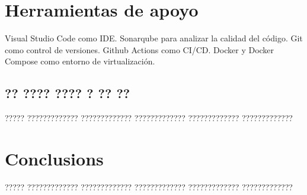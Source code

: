 \documentclass[11pt,spanish,listoffigures,listoftables]{tfgetsinf}
\begin{document}
\chapter{Herramientas de apoyo}

Visual Studio Code como IDE.
Sonarqube para analizar la calidad del código.
Git como control de versiones.
Github Actions como CI/CD.
Docker y Docker Compose como entorno de virtualización.


\section{?? ???? ???? ? ?? ??}

????? ????????????? ????????????? ????????????? ????????????? ?????????????



\chapter{Conclusions}

????? ????????????? ????????????? ????????????? ????????????? ????????????? 

\end{document}
